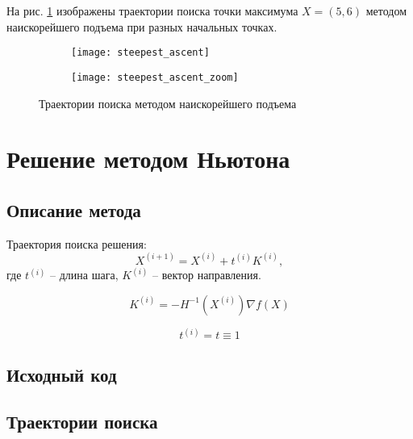 На рис. \ref{fig:steepest_ascent} изображены траектории поиска точки максимума $X = (5, 6)$ методом наискорейшего подъема при разных начальных точках.
\begin{figure}[H]
\begin{center}
	\begin{subfigure}[b]{0.49\textwidth}
		\texttt{[image: steepest\_ascent]}
	\end{subfigure}
	\begin{subfigure}[b]{0.49\textwidth}
		\texttt{[image: steepest\_ascent\_zoom]}
	\end{subfigure}
	\caption{Траектории поиска методом наискорейшего подъема}
	\label{fig:steepest_ascent}
\end{center}
\end{figure}

\section{Решение методом Ньютона}

\subsection{Описание метода}

Траектория поиска решения:
\begin{equation*}
X^{(i+1)}  = X^{(i)} + t^{(i)} K^{(i)},
\end{equation*}
где $t^{(i)}$ -- длина шага, $K^{(i)}$ -- вектор направления.

\begin{equation*}
K^{(i)} = -H^{-1}\left(X^{(i)}\right) \nabla f(X)
\end{equation*}

\begin{equation*}
t^{(i)} = t \equiv 1
\end{equation*}

\subsection{Исходный код}



\subsection{Траектории поиска}

